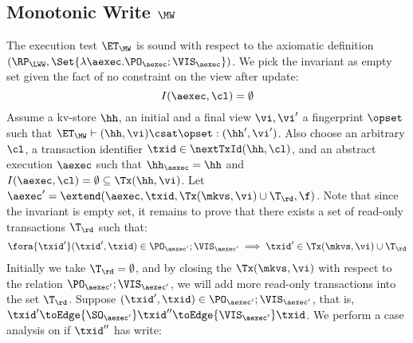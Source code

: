 \subsection{Monotonic Write \( \MW \)}
\label{sec:sound-complete-mw}

The execution test $\ET_\MW$ is sound with respect to the axiomatic definition 
$(\RP_{\LWW}, \Set{\lambda \aexec. \PO_{\aexec} ; \VIS_{\aexec} })$.
We pick the invariant as empty set given the fact of no constraint on the view after update:
\[ 
    I( \aexec, \cl ) = \emptyset 
\]
Assume a kv-store $\hh$, an initial and a final view $\vi, \vi'$  a fingerprint $\opset$ 
such that $\ET_{\MW} \vdash (\hh, \vi) \csat \opset: (\hh',\vi')$. 
Also choose an arbitrary $\cl$, a transaction identifier $\txid \in \nextTxId(\hh, \cl)$, 
and an abstract execution $\aexec$ such that $\hh_{\aexec} = \hh$ and 
\( I(\aexec, \cl) =  \emptyset \subseteq \Tx(\hh, \vi) \).
Let \( \aexec' = \extend(\aexec, \txid, \Tx(\mkvs, \vi) \cup \T_\rd, \f ) \).
Note that since the invariant  is empty set, it remains to prove that there exists a set of read-only transactions \( \T_\rd \) such that:
\[
    \begin{array}{@{}l@{}}
        \fora{ \txid' }  (\txid' ,\txid)  \in \PO_{\aexec'} ; \VIS_{\aexec'}
        \implies \txid' \in \Tx(\mkvs, \vi) \cup \T_\rd
    \end{array}
\]
Initially we take \( \T_\rd = \emptyset \), 
and by closing the \( \Tx(\mkvs, \vi) \) with respect to the relation \( \PO_{\aexec'} ; \VIS_{\aexec'} \),
we will add more read-only transactions into the set \( \T_\rd\).
Suppose \( (\txid' ,\txid)  \in \PO_{\aexec'} ; \VIS_{\aexec'} \), 
that is, \( \txid' \toEdge{\SO_{\aexec'}} \txid'' \toEdge{\VIS_{\aexec'}} \txid \).
We perform a case analysis on if \( \txid'' \) has write:
